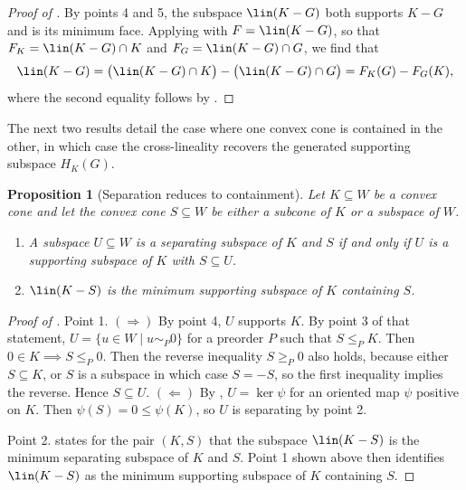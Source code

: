 \documentclass{article}
\theoremstyle{plain}
\newtheorem{proposition}[proposition]{Proposition}
\theoremstyle{definition}
\theoremstyle{remark}
\begin{document}
\begin{proof}[\hypertarget{loc:cross:lineality_from_the_difference_of_generated_faces.proof}{}Proof of ]

By  points 4 and 5, the subspace $\lin(K-G)$ both supports $K-G$ and is its minimum face. Applying  with $F = \lin(K-G)$, so that $F_K = \lin(K-G) \cap K$ and $F_G = \lin(K-G) \cap G$, we find that
\begin{equation*}
\lin(K-G) = \bigl(\lin(K-G) \cap K\bigr) - \bigl(\lin(K-G) \cap G\bigr) = F_K(G) - F_G(K),
\end{equation*}
where the second equality follows by .
\end{proof}
The next two results detail the case where one convex cone is contained in the other, in which case the cross-lineality recovers the generated supporting subspace $H_K(G)$.
\begin{proposition}[Separation reduces to containment]
\label{loc:separation_reduces_to_containment.statement}
Let $K \subseteq W$ be a convex cone and let the convex cone $S \subseteq W$ be either a subcone of $K$ or a subspace of $W$.
\begin{enumerate}
\item A subspace $U \subseteq W$ is a separating subspace of $K$ and $S$ if and only if $U$ is a supporting subspace of $K$ with $S \subseteq U$.
\item $\lin(K-S)$ is the minimum supporting subspace of $K$ containing $S$.
\end{enumerate}
\end{proposition}
\begin{proof}[\hypertarget{loc:separation_reduces_to_containment.proof}{}Proof of ]

Point 1. $(\Rightarrow)$ By  point 4, $U$ supports $K$. By point 3 of that statement, $U = \{u \in W \mid u \sim_{P} 0\}$ for a preorder $P$ such that $S \le_{P} K$. Then $0  \in K  \implies S \le_{P} 0$. Then the reverse inequality $S \ge_{P} 0$ also holds, because either $S \subseteq K$, or $S$ is a subspace in which case $S = -S$, so the first inequality implies the reverse. Hence $S \subseteq U$.
$(\Leftarrow)$ By , $U = \ker \psi$ for an oriented map $\psi$ positive on $K$. Then $\psi(S) = 0 \le \psi(K)$, so $U$ is separating by  point 2.

Point 2.  states for the pair $(K, S)$ that the subspace $\lin(K-S)$ is the minimum separating subspace of $K$ and $S$. Point 1 shown above then identifies $\lin(K-S)$ as the minimum supporting subspace of $K$ containing $S$.
\end{proof}
\end{document}
